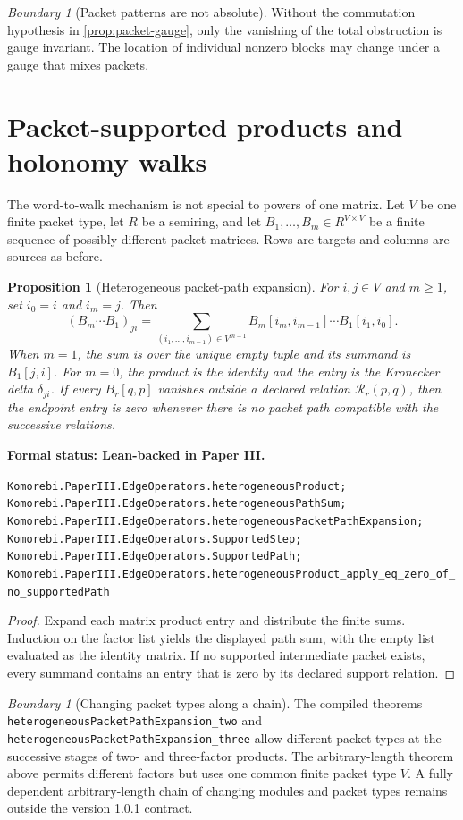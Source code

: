 \documentclass[11pt]{article}
\newtheorem{proposition}[theorem]{Proposition}
\theoremstyle{definition}
\theoremstyle{remark}
\newtheorem{boundary}[theorem]{Boundary}
\newcommand{\leanname}[1]{\nolinkurl{#1}}
\newcommand{\statusleanthree}[1]{%
  \par\smallskip\noindent
  {\color{leanblue}\textbf{Formal status: Lean-backed in Paper III.}}\par
  \begingroup\small\raggedright\leanname{#1}\par\endgroup\smallskip}
\begin{document}
\begin{boundary}[Packet patterns are not absolute]
Without the commutation hypothesis in \cref{prop:packet-gauge}, only the
vanishing of the total obstruction is gauge invariant.  The location of
individual nonzero blocks may change under a gauge that mixes packets.
\end{boundary}

\section{Packet-supported products and holonomy walks}
\label{sec:holonomy-walks}

The word-to-walk mechanism is not special to powers of one matrix.  Let $V$
be one finite packet type, let $R$ be a semiring, and let
$B_1,\ldots,B_m\in R^{V\times V}$ be a finite sequence of possibly different
packet matrices.  Rows are targets and columns are sources as before.

\begin{proposition}[Heterogeneous packet-path expansion]
\label{prop:heterogeneous-path}
For $i,j\in V$ and $m\geq1$, set $i_0=i$ and $i_m=j$.  Then
\[
\boxed{
(B_m\cdots B_1)_{ji}
=
\sum_{(i_1,\ldots,i_{m-1})\in V^{m-1}}
  B_m[i_m,i_{m-1}]\cdots B_1[i_1,i_0].
}
\]
When $m=1$, the sum is over the unique empty tuple and its summand is
$B_1[j,i]$.
For $m=0$, the product is the identity and the entry is the Kronecker delta
$\delta_{ji}$.  If every $B_r[q,p]$ vanishes outside a declared relation
$\mathcal R_r(p,q)$, then the endpoint entry is zero whenever there is no
packet path compatible with the successive relations.
\end{proposition}
\statusleanthree{Komorebi.PaperIII.EdgeOperators.heterogeneousProduct; Komorebi.PaperIII.EdgeOperators.heterogeneousPathSum; Komorebi.PaperIII.EdgeOperators.heterogeneousPacketPathExpansion; Komorebi.PaperIII.EdgeOperators.SupportedStep; Komorebi.PaperIII.EdgeOperators.SupportedPath; Komorebi.PaperIII.EdgeOperators.heterogeneousProduct_apply_eq_zero_of_no_supportedPath}

\begin{proof}
Expand each matrix product entry and distribute the finite sums.  Induction on
the factor list yields the displayed path sum, with the empty list evaluated
as the identity matrix.  If no supported intermediate packet exists, every
summand contains an entry that is zero by its declared support relation.
\end{proof}

\begin{boundary}[Changing packet types along a chain]
The compiled theorems
\leanname{heterogeneousPacketPathExpansion_two} and
\leanname{heterogeneousPacketPathExpansion_three} allow different packet
types at the successive stages of two- and three-factor products.  The
arbitrary-length theorem above permits different factors but uses one common
finite packet type $V$.  A fully dependent arbitrary-length chain of changing
modules and packet types remains outside the version 1.0.1 contract.
\end{boundary}
\end{document}
